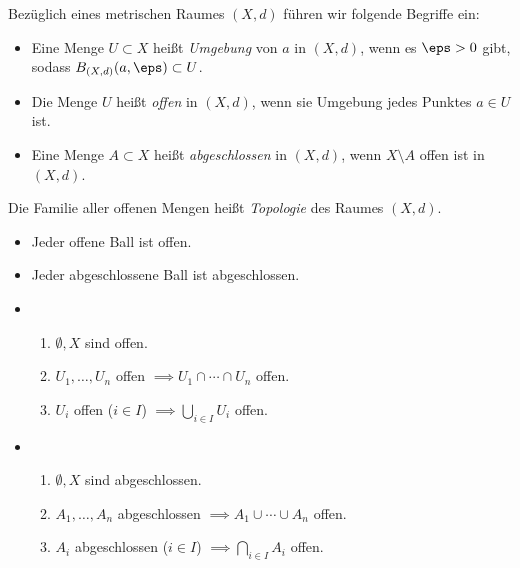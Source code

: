 \begin{df}
	Bezüglich eines metrischen Raumes $(X,d)$ führen wir folgende Begriffe ein:
	\begin{itemize}
		\item
			Eine Menge $U \subset X$ heißt \emph{Umgebung} von $a$ in $(X,d)$, wenn es $\eps > 0$ gibt, sodass $B_{(X,d)}(a,\eps) \subset U$.
		\item
			Die Menge $U$ heißt \emph{offen} in $(X,d)$, wenn sie Umgebung jedes Punktes $a \in U$ ist.
		\item
			Eine Menge $A \subset X$ heißt \emph{abgeschlossen} in $(X,d)$, wenn $X \setminus A$ offen ist in $(X,d)$.
	\end{itemize}

	Die Familie aller offenen Mengen heißt \emph{Topologie} des Raumes $(X,d)$.
\end{df}

\begin{prop}
	\begin{itemize}
		\item
			Jeder offene Ball ist offen.
		\item
			Jeder abgeschlossene Ball ist abgeschlossen.
		\item
			\begin{enumerate}[({O}1)]
				\item
					$\emptyset, X$ sind offen.
				\item
					$U_1,\dotsc,U_n$ offen $\implies U_1 \cap \dotsb \cap U_n$ offen.
				\item
					$U_i$ offen ($i\in I$) $\implies \bigcup_{i\in I} U_i$ offen.
			\end{enumerate}
		\item
			\begin{enumerate}[({A}1)]
				\item
					$\emptyset, X$ sind abgeschlossen.
				\item
					$A_1,\dotsc,A_n$ abgeschlossen $\implies A_1 \cup \dotsb \cup A_n$ offen.
				\item
					$A_i$ abgeschlossen ($i\in I$) $\implies \bigcap_{i\in I} A_i$ offen.
			\end{enumerate}
	\end{itemize}
\end{prop}


